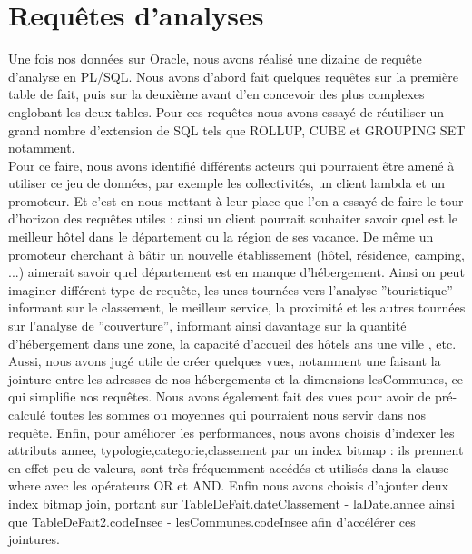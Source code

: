 \documentclass[a4paper,sffamily,12pt]{article}
\begin{document}
		\vspace{0.5cm}
			
	\section{Requêtes d'analyses}

		\vspace{0.5cm}
		
		Une fois nos données sur Oracle, nous avons réalisé une dizaine de requête d'analyse en PL/SQL. Nous avons d'abord fait quelques requêtes sur la première table de fait, puis sur la deuxième avant d'en concevoir des plus complexes englobant les deux tables. Pour ces requêtes nous avons essayé de réutiliser un grand nombre d'extension de SQL tels que ROLLUP, CUBE et GROUPING SET notamment. \\		
		
		Pour ce faire, nous avons identifié différents acteurs qui pourraient être amené à utiliser ce jeu de données, par exemple les collectivités, un client lambda et un promoteur. Et c'est en nous mettant à leur place que l'on a essayé de faire le tour d'horizon des requêtes utiles : ainsi un client pourrait souhaiter savoir quel est le meilleur hôtel dans le département ou la région de ses vacance. De même un promoteur cherchant à bâtir un nouvelle établissement (hôtel, résidence, camping, ...) aimerait savoir quel département est en manque d'hébergement. Ainsi on peut imaginer différent type de requête, les unes tournées vers l'analyse ''touristique'' informant sur le classement, le meilleur service, la proximité et les autres tournées sur l'analyse de ''couverture'', informant ainsi davantage sur la quantité d'hébergement dans une zone, la capacité d'accueil des hôtels ans une ville , etc. \\
		
		Aussi, nous avons jugé utile de créer quelques vues, notamment une faisant la jointure entre les adresses de nos hébergements et la dimensions lesCommunes, ce qui simplifie nos requêtes. Nous avons également fait des vues pour avoir de pré-calculé toutes les sommes ou moyennes qui pourraient nous servir dans nos requête. Enfin, pour améliorer les performances, nous avons choisis d'indexer les attributs annee, typologie,categorie,classement par un index bitmap : ils prennent en effet peu de valeurs, sont très fréquemment accédés et utilisés dans la clause where avec les opérateurs OR et AND. Enfin nous avons choisis d'ajouter deux index bitmap join, portant sur TableDeFait.dateClassement - laDate.annee ainsi que TableDeFait2.codeInsee - lesCommunes.codeInsee afin d'accélérer ces jointures. \\
		
\end{document}
